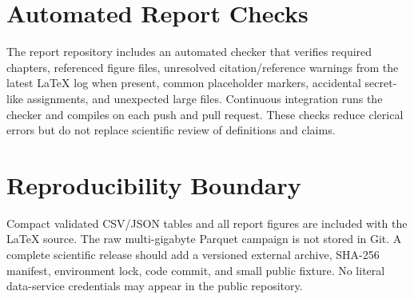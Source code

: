\section{Automated Report Checks}

The report repository includes an automated checker that verifies required chapters, referenced figure files, unresolved citation/reference warnings from the latest LaTeX log when present, common placeholder markers, accidental secret-like assignments, and unexpected large files. Continuous integration runs the checker and compiles  on each push and pull request. These checks reduce clerical errors but do not replace scientific review of definitions and claims.

\section{Reproducibility Boundary}

Compact validated CSV/JSON tables and all report figures are included with the LaTeX source. The raw multi-gigabyte Parquet campaign is not stored in Git. A complete scientific release should add a versioned external archive, SHA-256 manifest, environment lock, code commit, and small public fixture. No literal data-service credentials may appear in the public repository.
